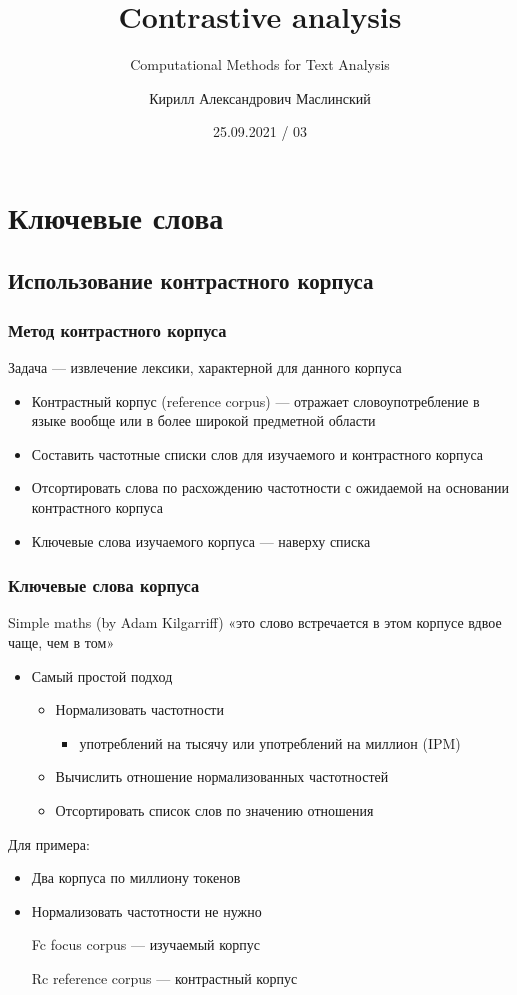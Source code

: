 \documentclass[svgnames]{beamer}
\title[CMTA 03] %
{Contrastive analysis}
\subtitle
{Computational Methods for Text Analysis} %
\author%
{Кирилл Александрович Маслинский}
\institute%
{НИУ ВШЭ Санкт-Петербург}
\date%
{25.09.2021 / 03}
\begin{document}
\begin{frame}
  \titlepage
\end{frame}

\section{Ключевые слова}

\subsection{Использование контрастного корпуса}

\begin{frame}
  \frametitle{Метод контрастного корпуса}
  Задача — извлечение лексики, характерной для данного корпуса
  \begin{itemize}
  \item Контрастный корпус (reference corpus) — отражает
    словоупотребление в языке вообще или в более широкой предметной
    области
  \item Составить частотные списки слов для изучаемого и контрастного
    корпуса
  \item Отсортировать слова по расхождению частотности с ожидаемой
    на основании контрастного корпуса
  \item Ключевые слова изучаемого корпуса — наверху списка
  \end{itemize}
\end{frame}


\begin{frame}
  \frametitle{Ключевые слова корпуса}
  \begin{block}{Simple maths (by Adam Kilgarriff)}
  «это слово встречается в этом корпусе вдвое чаще, чем в том»
\end{block}
\begin{itemize}
\item Самый простой подход
  \begin{itemize}
  \item Нормализовать частотности
    \begin{itemize}
    \item употреблений на тысячу или употреблений на миллион (IPM)
    \end{itemize}
  \item Вычислить отношение нормализованных частотностей
  \item Отсортировать список слов по значению отношения
  \end{itemize}
\end{itemize}

Для примера: 
\begin{itemize}
\item Два корпуса по миллиону токенов
\item Нормализовать частотности не нужно
\item[Fc] focus corpus — изучаемый корпус
\item[Rc] reference corpus — контрастный корпус
\end{itemize}
\end{frame}
\end{document}
